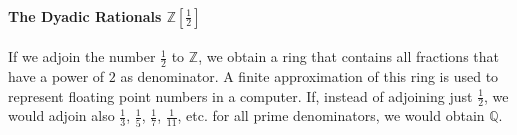 
\paragraph{The Dyadic Rationals $\mathbb{Z}[\frac{1}{2}]$}
If we adjoin the number $\frac{1}{2}$ to $\mathbb{Z}$, we obtain a ring that contains all fractions that have a power of $2$ as denominator. A finite approximation of this ring is used to represent floating point numbers in a computer. If, instead of adjoining just $\frac{1}{2}$, we would adjoin also $\frac{1}{3}$, $\frac{1}{5}$, $\frac{1}{7}$, $\frac{1}{11}$, etc. for all prime denominators, we would obtain $\mathbb{Q}$.

